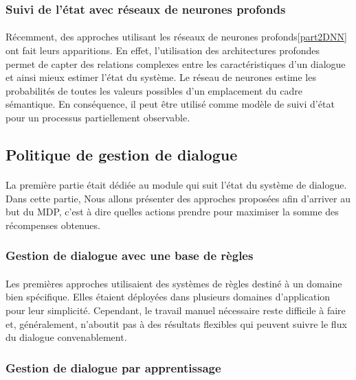 \subsubsection{Suivi de l’état avec réseaux de neurones profonds}
\paragraph{}
Récemment, des approches utilisant les réseaux de neurones profonds\ref{part2DNN} ont fait leurs apparitions. En effet, l'utilisation des architectures profondes permet de capter des relations complexes entre les caractéristiques d'un dialogue et ainsi mieux estimer l'état du système. Le réseau de neurones estime les probabilités de toutes les valeurs possibles d’un emplacement du cadre sémantique\cite{Henderson2013}. En conséquence, il peut être utilisé comme modèle de suivi d'état pour un processus partiellement observable.

	\subsection{Politique de gestion de dialogue}
		\paragraph{}
		La première partie était dédiée au module qui suit l’état du système de dialogue. Dans cette partie, Nous allons présenter des approches proposées afin d’arriver au but du MDP, c’est à dire quelles actions prendre pour maximiser la somme des récompenses obtenues.
		\subsubsection{Gestion de dialogue avec une base de règles}
		\paragraph{}
		Les premières approches utilisaient des systèmes de règles destiné à un domaine bien spécifique. Elles étaient déployées dans plusieurs domaines d’application pour leur simplicité. Cependant, le travail manuel nécessaire reste difficile à faire et, généralement, n’aboutit pas à des résultats flexibles qui peuvent suivre le flux du dialogue convenablement\cite{Lee2010}.
	\subsubsection{Gestion de dialogue par apprentissage}
